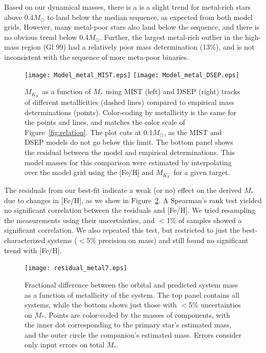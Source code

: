 \documentclass[twocolumn]{aastex62}
\newcommand{\mks}{$M_{K_S}$}
\begin{document}
Based on our dynamical masses, there is a is a slight trend for metal-rich stars above 0.4$M_\odot$ to land below the median sequence, as expected from both model grids. However, many metal-poor stars also land below the sequence, and there is no obvious trend below 0.4$M_\odot$. Further, the largest metal-rich outlier in the high-mass region (Gl 99) had a relatively poor mass determination (13\%), and is not inconsistent with the sequence of more meta-poor binaries. 

\begin{figure}[htp]
\begin{center}
\texttt{[image: Model\_metal\_MIST.eps]}
\texttt{[image: Model\_metal\_DSEP.eps]}
\caption{\mks\ as a function of $M_*$ using MIST (left) and DSEP (right) tracks of different metallicities (dashed lines) compared to empirical mass determinations (points). Color-coding by metallicity is the same for the points and lines, and matches the color scale of Figure~\ref{fig:relation}. The plot cuts at 0.1$M_\odot$, as the MIST and DSEP models do not go below this limit. The bottom panel shows the residual between the model and empirical determinations. This model masses for this comparison were estimated by interpolating over the model grid using the [Fe/H] and \mks\ for a given target. }
\label{fig:mk_metal}
\end{center}
\end{figure}

The residuals from our best-fit indicate a weak (or no) effect on the derived $M_*$ due to changes in [Fe/H], as we show in Figure~\ref{fig:metal_resid}. A Spearman's rank test yielded no significant correlation between the residuals and [Fe/H]. We tried resampling the measurements using their uncertainties, and $<$1\% of samples showed a significant correlation. We also repeated this test, but restricted to just the best-characterized systems ($<5\%$ precision on mass) and still found no significant trend with [Fe/H]. 

\begin{figure}[htp]
\begin{center}
\texttt{[image: residual\_metal7.eps]}
\caption{Fractional difference between the orbital and predicted system mass as a function of metallicity of the system. The top panel contains all systems, while the bottom shows just those with $<$5\% uncertainties on $M_*$. Points are color-coded by the masses of components, with the inner dot corresponding to the primary star's estimated mass, and the outer circle the companion's estimated mass. Errors consider only input errors on total $M_*$.}
\label{fig:metal_resid}
\end{center}
\end{figure}
\end{document}
